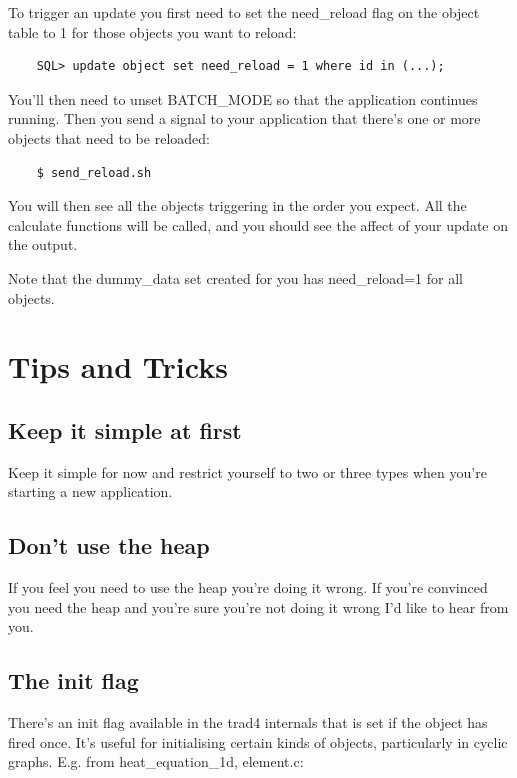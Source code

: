 \documentclass{report}
\begin{document}
To trigger an update you first need to set the need_reload flag on the object table to 1 for those objects you want to reload:

\begin{verbatim}
    SQL> update object set need_reload = 1 where id in (...);
\end{verbatim}

You'll then need to unset BATCH_MODE so that the application continues running. Then you send a signal to your application that there's one or more objects that need to be reloaded:

\begin{verbatim}
    $ send_reload.sh 
\end{verbatim}

You will then see all the objects triggering in the order you expect. All the calculate functions will be called, and you should see the affect of your update on the output.

Note that the dummy_data set created for you has need_reload=1 for all objects.

\section{Tips and Tricks}

\subsection{Keep it simple at first}

Keep it simple for now and restrict yourself to two or three types when you're starting a new application.

\subsection{Don't use the heap}

If you feel you need to use the heap you're doing it wrong. If you're convinced you need the heap and you're sure you're not doing it wrong I'd like to hear from you.

\subsection{The init flag}

There's an init flag available in the trad4 internals that is set if the object has fired once. It's useful for initialising certain kinds of objects, particularly in cyclic graphs. E.g. from heat_equation_1d, element.c:
\end{document}
